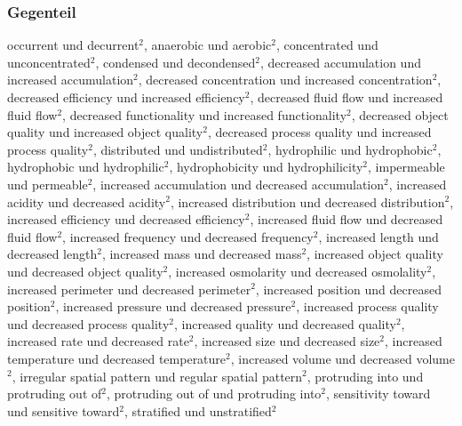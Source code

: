 \subsubsection{Gegenteil}
occurrent und decurrent$^2$, anaerobic und aerobic$^2$, concentrated und\\
unconcentrated$^2$, condensed und decondensed$^2$, decreased accumulation und
increased accumulation$^2$, decreased concentration und increased
concentration$^2$, decreased efficiency und increased efficiency$^2$, decreased
fluid flow und increased fluid flow$^2$, decreased functionality und increased
functionality$^2$, decreased object quality und increased object quality$^2$,
decreased process quality und increased process quality$^2$, distributed und
undistributed$^2$, hydrophilic und hydrophobic$^2$, hydrophobic und hydrophilic$^2$,
hydrophobicity und hydrophilicity$^2$, impermeable und permeable$^2$, increased
accumulation und decreased accumulation$^2$, increased acidity und decreased
acidity$^2$, increased distribution und decreased distribution$^2$, increased
efficiency und decreased efficiency$^2$, increased fluid flow und decreased fluid
flow$^2$, increased frequency und decreased frequency$^2$, increased length und
decreased length$^2$, increased mass und decreased mass$^2$, increased object
quality und decreased object quality$^2$, increased osmolarity und decreased
osmolality$^2$, increased perimeter und decreased perimeter$^2$, increased
position und decreased position$^2$, increased pressure und decreased pressure$^2$,
increased process quality und decreased process quality$^2$, increased quality und
decreased quality$^2$, increased rate und decreased rate$^2$, increased size und
decreased size$^2$, increased temperature und decreased temperature$^2$, increased
volume und decreased volume$^2$, irregular spatial pattern und regular spatial
pattern$^2$, protruding into und protruding out of$^2$, protruding out of und
protruding into$^2$, sensitivity toward und sensitive toward$^2$, stratified und
unstratified$^2$

